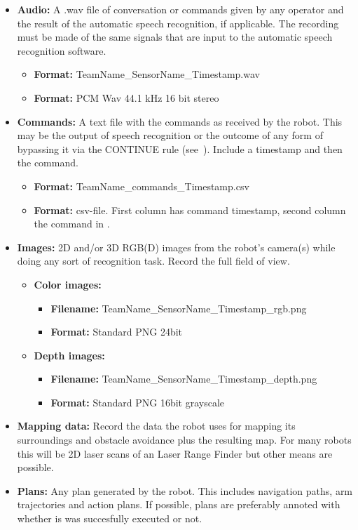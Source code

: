     \begin{itemize}
    \item \textbf{Audio: } A .wav file of conversation or commands given by any operator and the result of the automatic speech recognition, if applicable.
      The recording must be made of the same signals that are input to the automatic speech recognition software.
      \begin{itemize}
	\item \textbf{Format: } TeamName\_SensorName\_Timestamp.wav
	\item \textbf{Format: } PCM Wav 44.1 kHz 16 bit stereo
      \end{itemize}

    \item \textbf{Commands: } A text file with the commands as received by the robot.
      This may be the output of speech recognition or the outcome of any form of bypassing it via the CONTINUE rule (see~).
      Include a timestamp and then the command.
      \begin{itemize}
	\item \textbf{Format: } TeamName\_commands\_Timestamp.csv
	\item \textbf{Format: } csv-file. First column has command timestamp, second column the command in .
      \end{itemize}

    \item \textbf{Images: } 2D and/or 3D RGB(D) images from the robot's camera(s) while doing any sort of recognition task.
			    Record the full field of view.
    \begin{itemize}
      \item
	\textbf{Color images: }
	\begin{itemize}
	  \item \textbf{Filename: } TeamName\_SensorName\_Timestamp\_rgb.png
	  \item \textbf{Format: } Standard PNG 24bit
	\end{itemize}
      \item
	\textbf{Depth images: }
	\begin{itemize}
	  \item \textbf{Filename: } TeamName\_SensorName\_Timestamp\_depth.png
	  \item \textbf{Format: } Standard PNG 16bit grayscale
	\end{itemize}
    \end{itemize}

    \item \textbf{Mapping data: } Record the data the robot uses for mapping its surroundings and obstacle avoidance plus the resulting map.
      For many robots this will be 2D laser scans of an Laser Range Finder but other means are possible.

    \item \textbf{Plans: } Any plan generated by the robot. This includes navigation paths, arm trajectories and action plans.
      If possible, plans are preferably annoted with whether is was succesfully executed or not.
    \end{itemize}

